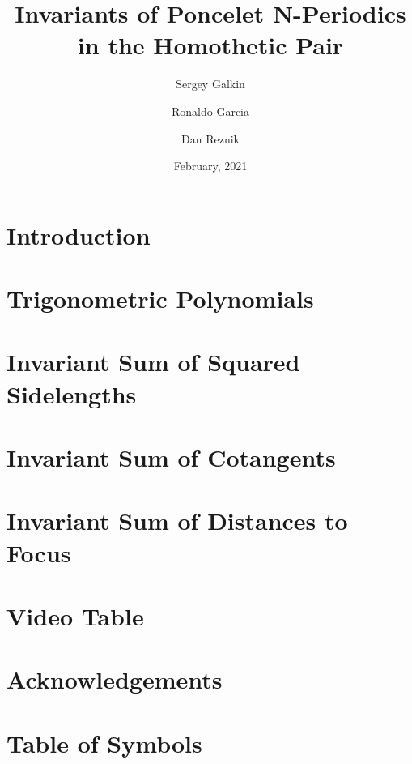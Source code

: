 \documentclass{amsart}
\title[Invariants of Poncelet N-Periodics in the Homothetic Pair]{Invariants of Poncelet N-Periodics\\in the Homothetic Pair}
\author{Sergey Galkin}
\author{Ronaldo Garcia}
\author{Dan Reznik}
\date{February, 2021}
\begin{document}
\maketitle



\section{Introduction}
\label{sec:intro}


\section{Trigonometric Polynomials}
\label{sec:trig-polys}


\section{Invariant Sum of Squared Sidelengths}


\section{Invariant Sum of Cotangents}
\label{sec:cotangent}


\section{Invariant Sum of Distances to Focus}
\label{sec:dist-focus}


%

\section{Video Table}
\label{sec:video-table}


\section*{Acknowledgements}


\appendix

%

%

\section{Table of Symbols}

\label{app:symbols}


 

\end{document}

